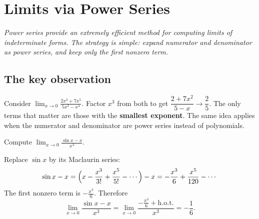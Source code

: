 \section{Limits via Power Series}
\label{sec:14.13}

\textit{Power series provide an extremely efficient method for computing limits of indeterminate forms.  The strategy is simple: expand numerator and denominator as power series, and keep only the first nonzero term.}

\subsection*{The key observation}

Consider $\displaystyle\lim_{x\to 0}\frac{2x^{3}+7x^{5}}{5x^{3}-x^{4}}$.  Factor $x^{3}$ from both to get $\dfrac{2+7x^{2}}{5-x}\to\dfrac{2}{5}$.  The only terms that matter are those with the \textbf{smallest exponent}.  The same idea applies when the numerator and denominator are power series instead of polynomials.

\begin{example}
\label{ex:14-13}
Compute $\displaystyle\lim_{x\to 0}\frac{\sin x - x}{x^{3}}$.

Replace $\sin x$ by its Maclaurin series:
\[
  \sin x - x
  = \Bigl(x - \frac{x^{3}}{3!}+\frac{x^{5}}{5!}-\cdots\Bigr) - x
  = -\frac{x^{3}}{6} + \frac{x^{5}}{120} - \cdots
\]
The first nonzero term is $-\frac{x^{3}}{6}$.  Therefore
\[
  \lim_{x\to 0}\frac{\sin x - x}{x^{3}}
  = \lim_{x\to 0}\frac{-\frac{x^{3}}{6}+\text{h.o.t.}}{x^{3}}
  = -\frac{1}{6}.
\]
\end{example}

